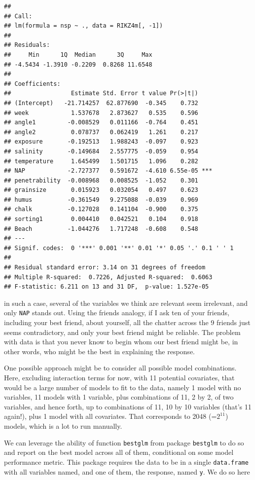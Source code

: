 \documentclass[
]{book}
\begin{document}
\begin{verbatim}
## 
## Call:
## lm(formula = nsp ~ ., data = RIKZ4m[, -1])
## 
## Residuals:
##     Min      1Q  Median      3Q     Max 
## -4.5434 -1.3910 -0.2209  0.8268 11.6548 
## 
## Coefficients:
##                 Estimate Std. Error t value Pr(>|t|)    
## (Intercept)   -21.714257  62.877690  -0.345    0.732    
## week            1.537678   2.873627   0.535    0.596    
## angle1         -0.008529   0.011166  -0.764    0.451    
## angle2          0.078737   0.062419   1.261    0.217    
## exposure       -0.192513   1.988243  -0.097    0.923    
## salinity       -0.149684   2.557775  -0.059    0.954    
## temperature     1.645499   1.501715   1.096    0.282    
## NAP            -2.727377   0.591672  -4.610 6.55e-05 ***
## penetrability  -0.008968   0.008525  -1.052    0.301    
## grainsize       0.015923   0.032054   0.497    0.623    
## humus          -0.361549   9.275088  -0.039    0.969    
## chalk          -0.127028   0.141104  -0.900    0.375    
## sorting1        0.004410   0.042521   0.104    0.918    
## Beach          -1.044276   1.717248  -0.608    0.548    
## ---
## Signif. codes:  0 '***' 0.001 '**' 0.01 '*' 0.05 '.' 0.1 ' ' 1
## 
## Residual standard error: 3.14 on 31 degrees of freedom
## Multiple R-squared:  0.7226, Adjusted R-squared:  0.6063 
## F-statistic: 6.211 on 13 and 31 DF,  p-value: 1.527e-05
\end{verbatim}

in such a case, several of the variables we think are relevant seem irrelevant, and only \texttt{NAP} stands out. Using the friends analogy, if I ask ten of your friends, including your best friend, about yourself, all the chatter across the 9 friends just seems contradictory, and only your best friend might be reliable. The problem with data is that you never know to begin whom our best friend might be, in other words, who might be the best in explaining the response.

One possible approach might be to consider all possible model combinations. Here, excluding interaction terms for now, with 11 potential covariates, that would be a large number of models to fit to the data, namely 1 model with no variables, 11 models with 1 variable, plus combinations of 11, 2 by 2, of two variables, and hence forth, up to combinations of 11, 10 by 10 variables (that's 11 again!), plus 1 model with all covariates. That corresponds to 2048 (=\(2^11\)) models, which is a lot to run manually.

We can leverage the ability of function \texttt{bestglm} from package \texttt{bestglm} to do so and report on the best model across all of them, conditional on some model performance metric. This package requires the data to be in a single \texttt{data.frame} with all variables named, and one of them, the response, named \texttt{y}. We do so here
\end{document}

